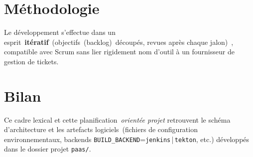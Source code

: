 \section*{Méthodologie}

Le développement s'effectue dans un esprit~\textbf{itératif}~(objectifs~(backlog)~découpés, revues après chaque jalon)~, compatible avec Scrum sans lier rigidement nom d'outil à un fournisseur de gestion de tickets.

\section*{Bilan}

Ce cadre lexical et cette planification~\emph{orientée projet} retrouvent le schéma d'architecture et les artefacts logiciels~(fichiers de configuration environnementaux, backends \texttt{BUILD\_BACKEND}=\texttt{jenkins}\,|\,\texttt{tekton}, etc.) développés dans le dossier projet \texttt{paas/}.
